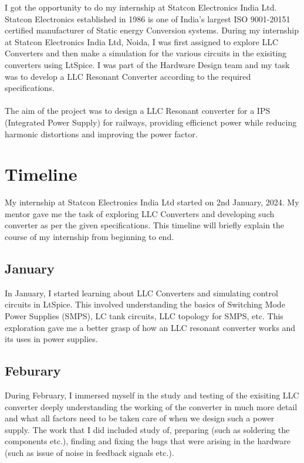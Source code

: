 I got the opportunity to do my internship at Statcon Electronics India Ltd.
Statcon Electronics established in 1986 is one of India's largest ISO
9001-20151 certified manufacturer of Static energy Conversion systems. During my
internship at Statcon Electronics India Ltd, Noida, I was first assigned to
explore LLC Converters and then make a simulation for the various circuits in the 
exisiting converters using LtSpice. I was part of the Hardware Design team and
my task was to develop a LLC Resonant Converter according to the required specifications.\\
\\
The aim of the project was to design a LLC Resonant converter for a IPS (Integrated
Power Supply) for railways, providing efficienct power while reducing
harmonic distortions and improving the power factor.

\section{Timeline}
My internship at Statcon Electronics India Ltd started on 2nd January, 2024.
My mentor gave me the task of exploring LLC Converters and developing such
converter as per the given specifications. This timeline will briefly
explain the course of my internship from beginning to end.

\subsection{January}
In January, I started learning about LLC Converters and simulating control
circuits in LtSpice. This involved understanding the basics of Switching
Mode Power Supplies (SMPS), LC tank circuits, LLC topology for SMPS, etc.
This exploration gave me a better grasp of how an LLC resonant converter
works and its uses in power supplies.

\subsection{Feburary}
During February, I immersed myself in the study and testing of the exisiting
LLC converter deeply understanding the working of the converter in much more
detail and what all factors need to be taken care of when we design such a
power supply. The work that I did included study of, preparing (such as
soldering the components etc.), finding and fixing the bugs that were arising
in the hardware (such as issue of noise in feedback signals etc.).

